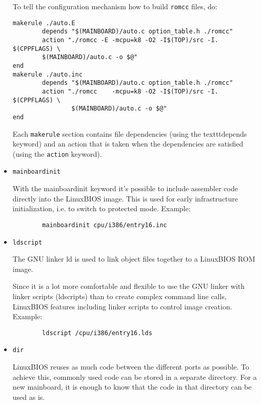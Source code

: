 \documentclass[titlepage,12pt]{article}
\begin{document}
\begin{itemize}
To tell the configuration mechanism how to build \texttt{romcc} files, 
do:

\begin{verbatim}
makerule ./auto.E
        depends "$(MAINBOARD)/auto.c option_table.h ./romcc"
        action "./romcc -E -mcpu=k8 -O2 -I$(TOP)/src -I. $(CPPFLAGS) \
		$(MAINBOARD)/auto.c -o $@"
end
makerule ./auto.inc
        depends "$(MAINBOARD)/auto.c option_table.h ./romcc"
        action "./romcc    -mcpu=k8 -O2 -I$(TOP)/src -I. $(CPPFLAGS) \
                $(MAINBOARD)/auto.c -o $@"
end
\end{verbatim}

Each \texttt{makerule} section contains file dependencies (using the
texttt{depends} keyword) and an action that is taken when the dependencies 
are satisfied (using the \texttt{action} keyword).

\item \begin{verbatim}mainboardinit\end{verbatim}

With the mainboardinit keyword it's possible to include assembler code
directly into the LinuxBIOS image. This is used for early infrastructure
initialization, i.e. to switch to protected mode. Example:

\begin{verbatim}
        mainboardinit cpu/i386/entry16.inc
\end{verbatim}

\item \begin{verbatim}ldscript\end{verbatim}

The GNU linker ld is used to link object files together to a LinuxBIOS
ROM image.

Since it is a lot more comfortable and flexible to use the GNU linker
with linker scripts (ldscripts) than to create complex command line
calls, LinuxBIOS features including linker scripts to control image
creation. Example:

\begin{verbatim}
        ldscript /cpu/i386/entry16.lds
\end{verbatim}


\item \begin{verbatim}dir\end{verbatim}

LinuxBIOS reuses as much code between the different ports as possible.
To achieve this, commonly used code can be stored in a separate
directory. For a new mainboard, it is enough to know that the code in
that directory can be used as is.


\end{itemize}
\end{document}

